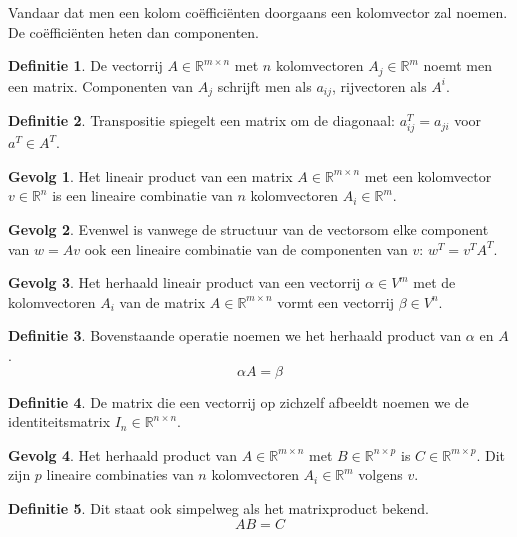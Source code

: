 \documentclass{amsart}
\theoremstyle{definition}
\newtheorem{dfn}{Definitie}[section]
\newtheorem{csq}{Gevolg}[section]
\newcommand{\realnums}{\mathbb{R}}
\newcommand{\realn}[1][n]{\realnums^{#1}}
\newcommand{\realmx}[2][n]{\realn[#2 \times #1]}
\newcommand{\realnxn}{\realmx{n}}
\newcommand{\realmxn}{\realmx{m}}
\begin{document}
Vandaar dat men een kolom coëfficiënten doorgaans een kolomvector zal noemen. De coëfficiënten heten dan componenten.

\begin{dfn}
	De vectorrij $A \in \realn[m \times n]$ met $n$ kolomvectoren $A_{j} \in \realn[m]$ noemt men een matrix.
	Componenten van $A_j$ schrijft men als $a_{ij}$, rijvectoren als $A^i$.
\end{dfn}

\begin{dfn}
	Transpositie spiegelt een matrix om de diagonaal: $a^T_{ij} = a_{ji}$ voor $a^T \in A^T$.
\end{dfn}

\begin{csq}
	Het lineair product van een matrix $A \in \realmxn$ met een kolomvector $v \in \realn$ is een lineaire combinatie van $n$ kolomvectoren $A_i \in \realn[m]$.
\end{csq}

\begin{csq}
	Evenwel is vanwege de structuur van de vectorsom elke component van $w = Av$ ook een lineaire combinatie van de componenten van $v$: $w^T = v^TA^T$.
\end{csq}

\begin{csq}
	Het herhaald lineair product van een vectorrij $\alpha \in V^m$ met de kolomvectoren $A_i$ van de matrix $A \in \realmxn$ vormt een vectorrij $\beta \in V^n$.
\end{csq}

\begin{dfn}
	Bovenstaande operatie noemen we het herhaald product van $\alpha$ en $A$.
	\begin{equation*}
		\alpha A = \beta
	\end{equation*}
\end{dfn}

\begin{dfn}
	De matrix die een vectorrij op zichzelf afbeeldt noemen we de identiteitsmatrix $I_n \in \realnxn$.
\end{dfn}

\begin{csq}
	Het herhaald product van $A \in \realmxn$ met $B \in \realn[n \times p]$ is $C \in \realn[m \times p]$.
	Dit zijn $p$ lineaire combinaties van $n$ kolomvectoren $A_i \in \realn[m]$ volgens $v$.
\end{csq}

\begin{dfn}
	Dit staat ook simpelweg als het matrixproduct bekend.
	\begin{equation*}
		AB = C
	\end{equation*}
\end{dfn}
\end{document}
